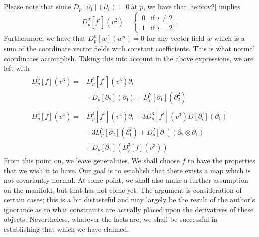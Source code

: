 \documentclass[11pt]{article}
\theoremstyle{remark}
\begin{document}
Please note that since $D_p[\partial_1] (\partial_1) = 0$ at $p$, we
have that \eqref{te:fcov2} implies
\[
D^2_p[f^i] (v^2)= 
\begin{cases} 
0 & \text{if $i \neq 2$} \\ 
1 & \text{if $i = 2$}
\end{cases}  . 
 \]
Furthermore, we have that $D^n_p[w] (w^n) = 0$ for any vector field $w$
which is a sum of the coordinate vector fields with constant
coefficients. This is what normal coordinates accomplish. Taking this
into account in the above expressions, we are left with 
\begin{subequations}
\begin{align}
\begin{split}
D^3_p[f] (v^3) =& 
D^3_p[f^i](v^3) \partial_i 
\\&
+ D_p[\partial_2](\partial_1)
+ D^2_p[\partial_1](\partial_2^2)
\end{split}
\label{te:ffcov3}
\\
\begin{split}
D^4_p[f] (v^4) =& 
D^4_p[f^i](v^4) \partial_i 
+3D^3_p[f^i](v^3) D[\partial_i](\partial_1) 
\\&
+3 D^2_p[\partial_2](\partial_1^2)
+ D^2_p[\partial_1](\partial_2\otimes \partial_1)
\\&
+ D_p[\partial_1](D_p^3[f](v^3)) 
\end{split}
\label{te:ffcov4}
\end{align}
\end{subequations} 
From this point on, we leave generalities. We shall choose $f$ to have
the properties that we wish it to have. Our goal is to establish that
   there exists a map which is not covariantly normal. At some point,
   we shall also make a further assumption on the manifold, but that
   has not come yet. The argument is consideration of certain cases;
   this is a bit distasteful and may largely be the result of the
   author's ignorance as to what constraints are actually placed upon
   the derivatives of these objects. Nevertheless, whatever the facts
   are, we shall be successful in establishing that which we have
   claimed. 
\end{document}
